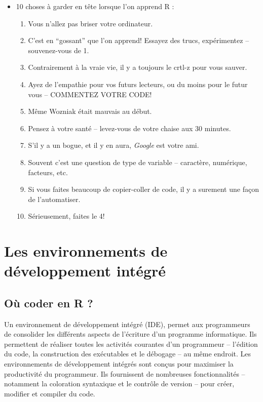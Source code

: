 \documentclass[
  letterpaper,
  DIV=11,
  numbers=noendperiod]{scrreprt}
\providecommand{\tightlist}{%
  \setlength{\itemsep}{0pt}\setlength{\parskip}{0pt}}\usepackage{longtable,booktabs,array}
\begin{document}
\begin{itemize}
\tightlist
\item
  10 choses à garder en tête lorsque l'on apprend R :

  \begin{enumerate}
  \def\labelenumi{\arabic{enumi}.}
  \tightlist
  \item
    Vous n'allez pas briser votre ordinateur.
  \item
    C'est en ``gossant'' que l'on apprend! Essayez des trucs,
    expérimentez -- souvenez-vous de 1.
  \item
    Contrairement à la vraie vie, il y a toujours le crtl-z pour vous
    sauver.
  \item
    Ayez de l'empathie pour vos futurs lecteurs, ou du moins pour le
    futur vous -- COMMENTEZ VOTRE CODE!
  \item
    Même Wozniak était mauvais au début.
  \item
    Pensez à votre santé -- levez-vous de votre chaise aux 30 minutes.
  \item
    S'il y a un bogue, et il y en aura, \emph{Google} est votre ami.
  \item
    Souvent c'est une question de type de variable -- caractère,
    numérique, facteurs, etc.
  \item
    Si vous faites beaucoup de copier-coller de code, il y a surement
    une façon de l'automatiser.
  \item
    Sérieusement, faites le 4!
  \end{enumerate}
\end{itemize}


\hypertarget{les-environnements-de-duxe9veloppement-intuxe9gruxe9}{%
\chapter{Les environnements de développement
intégré}\label{les-environnements-de-duxe9veloppement-intuxe9gruxe9}}

\hypertarget{ouxf9-coder-en-r}{%
\section{Où coder en R ?}\label{ouxf9-coder-en-r}}

Un environnement de développement intégré (IDE), permet aux programmeurs
de consolider les différents aspects de l'écriture d'un programme
informatique. Ils permettent de réaliser toutes les activités courantes
d'un programmeur -- l'édition du code, la construction des exécutables
et le débogage -- au même endroit. Les environnements de développement
intégrés sont conçus pour maximiser la productivité du programmeur. Ils
fournissent de nombreuses fonctionnalités -- notamment la coloration
syntaxique et le contrôle de version -- pour créer, modifier et compiler
du code.
\end{document}
